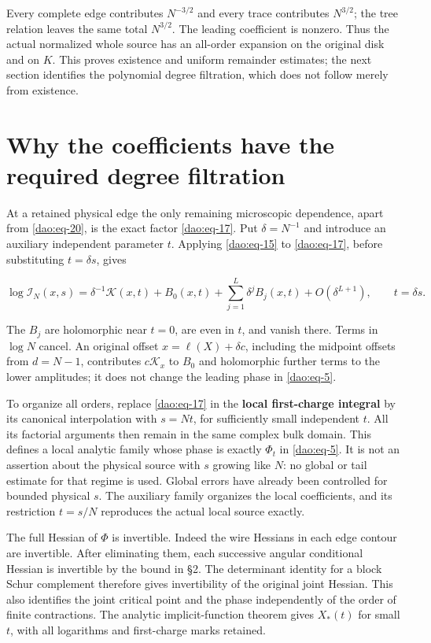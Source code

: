 Every complete edge contributes \(N^{-3/2}\) and every trace contributes \(N^{3/2}\); the tree relation leaves the same total \(N^{3/2}\). The leading coefficient is nonzero. Thus the actual normalized whole source has an all-order expansion on the original disk and on \(K\). This proves existence and uniform remainder estimates; the next section identifies the polynomial degree filtration, which does not follow merely from existence.

\section{Why the coefficients have the required degree filtration}\label{dao:sec-6}

At a retained physical edge the only remaining microscopic dependence, apart from \eqref{dao:eq-20}, is the exact factor \eqref{dao:eq-17}. Put \(\delta=N^{-1}\) and introduce an auxiliary independent parameter \(t\). Applying \eqref{dao:eq-15} to \eqref{dao:eq-17}, before substituting \(t=\delta s\), gives

\begin{equation}\label{dao:eq-21}
\log\mathcal I_N(x,s)
 =\delta^{-1}\mathcal K(x,t)+B_0(x,t)
       +\sum_{j=1}^{L}\delta^jB_j(x,t)+O(\delta^{L+1}),
               \qquad t=\delta s.
\end{equation}

The \(B_j\) are holomorphic near \(t=0\), are even in \(t\), and vanish there. Terms in \(\log N\) cancel. An original offset \(x=\ell(X)+\delta c\), including the midpoint offsets from \(d=N-1\), contributes \(c\mathcal K_x\) to \(B_0\) and holomorphic further terms to the lower amplitudes; it does not change the leading phase in \eqref{dao:eq-5}.

To organize all orders, replace \eqref{dao:eq-17} in the \textbf{local first-charge integral} by its canonical interpolation with \(s=Nt\), for sufficiently small independent \(t\). All its factorial arguments then remain in the same complex bulk domain. This defines a local analytic family whose phase is exactly \(\Phi_t\) in \eqref{dao:eq-5}. It is not an assertion about the physical source with \(s\) growing like \(N\): no global or tail estimate for that regime is used. Global errors have already been controlled for bounded physical \(s\). The auxiliary family organizes the local coefficients, and its restriction \(t=s/N\) reproduces the actual local source exactly.

The full Hessian of \(\Phi\) is invertible. Indeed the wire Hessians in each edge contour are invertible. After eliminating them, each successive angular conditional Hessian is invertible by the bound in §2. The determinant identity for a block Schur complement therefore gives invertibility of the original joint Hessian. This also identifies the joint critical point and the phase independently of the order of finite contractions. The analytic implicit-function theorem gives \(X_*(t)\) for small \(t\), with all logarithms and first-charge marks retained.

